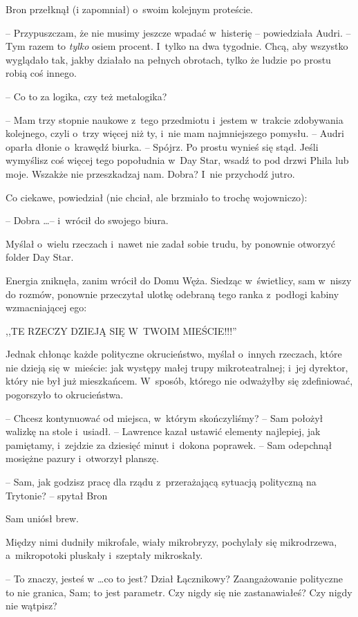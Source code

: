 \documentclass[oneside,polish,11pt,rmheadings]{mwbk}
\begin{document}
Bron przełknął (i zapomniał) o~swoim kolejnym proteście. 

-- Przypuszczam, że nie musimy jeszcze wpadać w~histerię -- powiedziała Audri. -- Tym razem to \textit{tylko }osiem procent. I~tylko na dwa tygodnie. Chcą, aby wszystko wyglądało tak, jakby działało na pełnych obrotach, tylko że ludzie po prostu robią coś innego. 

-- Co to za logika, czy też metalogika? 

-- Mam trzy stopnie naukowe z~tego przedmiotu i~jestem w~trakcie zdobywania kolejnego, czyli o~trzy więcej niż ty, i~nie mam najmniejszego pomysłu. -- Audri oparła dłonie o~krawędź biurka. -- Spójrz. Po prostu wynieś się stąd. Jeśli wymyślisz coś więcej tego popołudnia w~Day Star, wsadź to pod drzwi Phila lub moje. Wszakże nie przeszkadzaj nam. Dobra? I~nie przychodź jutro. 

Co ciekawe, powiedział (nie chciał, ale brzmiało to trochę wojowniczo): 

-- Dobra \ldots  -- i~wrócił do swojego biura. 

Myślał o~wielu rzeczach i~nawet nie zadał sobie trudu, by ponownie otworzyć folder Day Star. 

Energia zniknęła, zanim wrócił do Domu Węża. Siedząc w~świetlicy, sam w~niszy do rozmów, ponownie przeczytał ulotkę odebraną tego ranka z~podłogi kabiny wzmacniającej ego: 

,,TE RZECZY DZIEJĄ SIĘ W~TWOIM MIEŚCIE!!!'' 

Jednak chłonąc każde polityczne okrucieństwo, myślał o~innych rzeczach, które nie dzieją się w~mieście: jak występy małej trupy mikroteatralnej; i~jej dyrektor, który nie był już mieszkańcem. W~sposób, którego nie odważyłby się zdefiniować, pogorszyło to okrucieństwa. 

-- Chcesz kontynuować od miejsca, w~którym skończyliśmy? -- Sam położył walizkę na stole i~usiadł. -- Lawrence kazał ustawić elementy najlepiej, jak pamiętamy, i~zejdzie za dziesięć minut i~dokona poprawek. --  Sam odepchnął mosiężne pazury i~otworzył planszę. 

-- Sam, jak godzisz pracę dla rządu z~przerażającą sytuacją polityczną na Trytonie? -- spytał Bron 

Sam uniósł brew. 

Między nimi dudniły mikrofale, wiały mikrobryzy, pochylały się mikrodrzewa, a~mikropotoki pluskały i~szeptały mikroskały. 

-- To znaczy, jesteś w \ldots  co to jest? Dział Łącznikowy? Zaangażowanie polityczne to nie granica, Sam; to jest parametr. Czy nigdy się nie zastanawiałeś? Czy nigdy nie wątpisz? 
\end{document}
